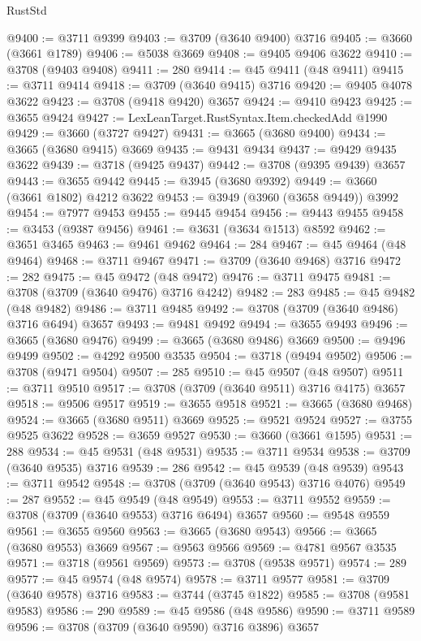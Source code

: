 \begin{lexlean}{RustStd}
\begin{coremodule}
@9400 := @3711 @9399
@9403 := @3709 (@3640 @9400) @3716
@9405 := @3660 (@3661 @1789)
@9406 := @5038 @3669
@9408 := @9405 @9406 @3622
@9410 := @3708 (@9403 @9408)
@9411 := 280
@9414 := @45 @9411 (@48 @9411)
@9415 := @3711 @9414
@9418 := @3709 (@3640 @9415) @3716
@9420 := @9405 @4078 @3622
@9423 := @3708 (@9418 @9420) @3657
@9424 := @9410 @9423
@9425 := @3655 @9424
@9427 := LexLeanTarget.RustSyntax.Item.checkedAdd @1990
@9429 := @3660 (@3727 @9427)
@9431 := @3665 (@3680 @9400)
@9434 := @3665 (@3680 @9415) @3669
@9435 := @9431 @9434
@9437 := @9429 @9435 @3622
@9439 := @3718 (@9425 @9437)
@9442 := @3708 (@9395 @9439) @3657
@9443 := @3655 @9442
@9445 := @3945 (@3680 @9392)
@9449 := @3660 (@3661 @1802) @4212 @3622
@9453 := @3949 (@3960 (@3658 @9449)) @3992
@9454 := @7977 @9453
@9455 := @9445 @9454
@9456 := @9443 @9455
@9458 := @3453 (@9387 @9456)
@9461 := @3631 (@3634 @1513) @8592
@9462 := @3651 @3465
@9463 := @9461 @9462
@9464 := 284
@9467 := @45 @9464 (@48 @9464)
@9468 := @3711 @9467
@9471 := @3709 (@3640 @9468) @3716
@9472 := 282
@9475 := @45 @9472 (@48 @9472)
@9476 := @3711 @9475
@9481 := @3708 (@3709 (@3640 @9476) @3716 @4242)
@9482 := 283
@9485 := @45 @9482 (@48 @9482)
@9486 := @3711 @9485
@9492 := @3708 (@3709 (@3640 @9486) @3716 @6494) @3657
@9493 := @9481 @9492
@9494 := @3655 @9493
@9496 := @3665 (@3680 @9476)
@9499 := @3665 (@3680 @9486) @3669
@9500 := @9496 @9499
@9502 := @4292 @9500 @3535
@9504 := @3718 (@9494 @9502)
@9506 := @3708 (@9471 @9504)
@9507 := 285
@9510 := @45 @9507 (@48 @9507)
@9511 := @3711 @9510
@9517 := @3708 (@3709 (@3640 @9511) @3716 @4175) @3657
@9518 := @9506 @9517
@9519 := @3655 @9518
@9521 := @3665 (@3680 @9468)
@9524 := @3665 (@3680 @9511) @3669
@9525 := @9521 @9524
@9527 := @3755 @9525 @3622
@9528 := @3659 @9527
@9530 := @3660 (@3661 @1595)
@9531 := 288
@9534 := @45 @9531 (@48 @9531)
@9535 := @3711 @9534
@9538 := @3709 (@3640 @9535) @3716
@9539 := 286
@9542 := @45 @9539 (@48 @9539)
@9543 := @3711 @9542
@9548 := @3708 (@3709 (@3640 @9543) @3716 @4076)
@9549 := 287
@9552 := @45 @9549 (@48 @9549)
@9553 := @3711 @9552
@9559 := @3708 (@3709 (@3640 @9553) @3716 @6494) @3657
@9560 := @9548 @9559
@9561 := @3655 @9560
@9563 := @3665 (@3680 @9543)
@9566 := @3665 (@3680 @9553) @3669
@9567 := @9563 @9566
@9569 := @4781 @9567 @3535
@9571 := @3718 (@9561 @9569)
@9573 := @3708 (@9538 @9571)
@9574 := 289
@9577 := @45 @9574 (@48 @9574)
@9578 := @3711 @9577
@9581 := @3709 (@3640 @9578) @3716
@9583 := @3744 (@3745 @1822)
@9585 := @3708 (@9581 @9583)
@9586 := 290
@9589 := @45 @9586 (@48 @9586)
@9590 := @3711 @9589
@9596 := @3708 (@3709 (@3640 @9590) @3716 @3896) @3657

\end{coremodule}
\end{lexlean}
